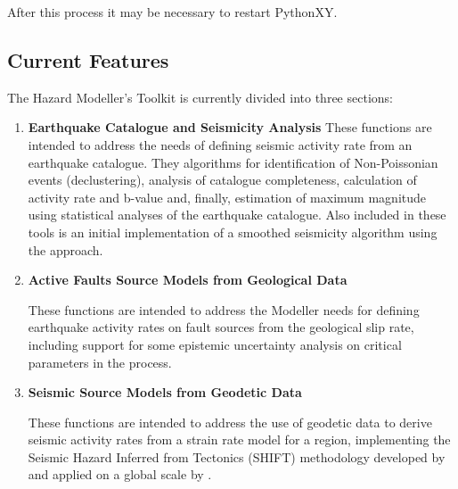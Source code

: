 After this process it may be necessary to restart PythonXY.

\subsection{Current Features}

The Hazard Modeller's Toolkit is currently divided into three sections: 

\begin{enumerate}
\item \textbf{Earthquake Catalogue and Seismicity Analysis}
    These functions are intended to address the needs of defining seismic activity rate from an earthquake catalogue. They algorithms for identification of Non-Poissonian events (declustering), analysis of catalogue completeness, calculation of activity rate and b-value and, finally, estimation of maximum magnitude using statistical analyses of the earthquake catalogue. Also included in these tools is an initial implementation of a smoothed seismicity algorithm using the \textcite{frankel1995} approach.
     
\item \textbf{Active Faults Source Models from Geological Data}

    These functions are intended to address the Modeller needs for defining earthquake activity rates on fault sources from the geological slip rate, including support for some epistemic uncertainty analysis on critical parameters in the process.

\item \textbf{Seismic Source Models from Geodetic Data}

    These functions are intended to address the use of geodetic data to derive seismic activity rates from a strain rate model for a region, implementing the Seismic Hazard Inferred from Tectonics (SHIFT) methodology developed by \textcite{BirdLiu2007} and applied on a global scale by \textcite{Bird_etal2010}.
\end{enumerate}

